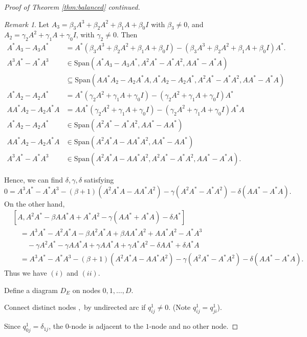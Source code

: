 \documentclass[
]{book}
\theoremstyle{definition}
\theoremstyle{definition}
\theoremstyle{definition}
\theoremstyle{definition}
\theoremstyle{remark}
\newtheorem*{remark}{Remark}
\begin{document}
\begin{proof}[Proof of Theorem \ref{thm:balanced} continued]
\begin{remark}
Let \(A_3 = \beta_3A^3 + \beta_2 A^2 + \beta_1 A + \beta_0 I\) with \(\beta_3\neq 0\), and \(A_2 = \gamma_2 A^2 + \gamma_1 A + \gamma_0 I\), with \(\gamma_2\neq 0\). Then
\begin{align}
A^*A_3-A_3A^* & = A^*(\beta_3 A^3 + \beta_2 A^2 + \beta_1 A + \beta_0 I) - (\beta_3 A^3 + \beta_2 A^2 + \beta_1 A + \beta_0 I)A^*.\\
A^3A^*-A^*A^3 & \in \mathrm{Span}(A^*A_3 - A_3A^*, A^2A^* - A^*A^2, AA^*-A^*A)\\
& \subseteq \mathrm{Span}(AA^*A_2 - A_2A^*A, A^*A_2-A_2A^*, A^2A^*-A^*A^2, AA^*-A^*A)\\
A^*A_2 - A_2A^* & = A^*(\gamma_2 A^2 + \gamma_1 A + \gamma_0 I) - (\gamma_2 A^2 + \gamma_1 A + \gamma_0 I)A^*\\
AA^*A_2 - A_2A^*A & = AA^*(\gamma_2 A^2 + \gamma_1 A + \gamma_0 I) - (\gamma_2 A^2 + \gamma_1 A + \gamma_0 I)A^*A\\
A^*A_2 - A_2A^* & \in \mathrm{Span}(A^2A^*-A^*A^2, AA^*-AA^*)\\
AA^*A_2 - A_2A^*A & \in \mathrm{Span}(A^2A^*A-AA^*A^2, AA^*-AA^*)\\
A^3A^*-A^*A^3 & \in \mathrm{Span}(A^2A^*A-AA^*A^2, A^2A^*-A^*A^2, AA^*-A^*A).
\end{align}
\end{remark}

Hence, we can find \(\delta, \gamma, \delta\) satisfying
\[0 = A^3A^*-A^*A^3 - (\beta+1)(A^2A^*A-AA^*A^2)-\gamma(A^2A^*-A^*A^2)-\delta(AA^*-A^*A).\]
On the other hand,
\begin{align}
& [A, A^2A^*-\beta AA^*A+A^*A^2-\gamma(AA^*+A^*A)-\delta A^*]\\
& \quad = A^3A^*-A^2A^*A-\beta A^2A^*A + \beta AA^*A^2 + AA^*A^2 - A^*A^3 \\
& \quad\quad - \gamma A^2A^* - \gamma AA^*A + \gamma AA^*A + \gamma A^*A^2 - \delta AA^* + \delta A^*A\\
& \quad = A^3A^* - A^*A^3 - (\beta+1)(A^2A^*A-AA^*A^2)-\gamma(A^2A^*-A^*A^2)-\delta (AA^*-A^*A).
\end{align}
Thus we have \((i)\) and \((ii)\).

Define a diagram \(D_E\) on nodes \(0, 1, \ldots, D\).

Connect distinct nodes \(,\) by undirected arc if \(q^1_{ij}\neq 0\). (Note \(q^1_{ij} = q^1_{ji}\)).

Since \(q^1_{0j} = \delta_{1j}\), the \(0\)-node is adjacent to the \(1\)-node and no other node.


\end{proof}
\end{document}
